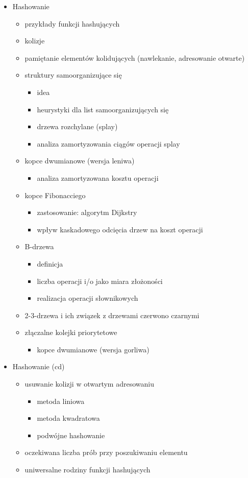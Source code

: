 \begin{itemize}
\item Hashowanie
\begin{itemize}
	\item przykłady funkcji hashujących
	\item kolizje
	\item pamiętanie elementów kolidujących (nawlekanie, adresowanie otwarte)
	\item struktury samoorganizujące się
	\begin{itemize}
		\item idea
		\item heurystyki dla list samoorganizujących się
		\item drzewa rozchylane (splay)
		\item analiza zamortyzowania ciągów operacji splay
	\end{itemize}
	\item kopce dwumianowe (wersja leniwa)
	\begin{itemize}
		\item analiza zamortyzowana kosztu operacji
	\end{itemize}
	\item kopce Fibonacciego
	\begin{itemize}
		\item zastosowanie: algorytm Dijkstry
		\item wpływ kaskadowego odcięcia drzew na koszt operacji
	\end{itemize}
	\item B-drzewa
	\begin{itemize}
		\item definicja
		\item liczba operacji i/o jako miara złożoności
		\item realizacja operacji słownikowych
	\end{itemize}
	\item 2-3-drzewa i ich związek z drzewami czerwono czarnymi
	\item złączalne kolejki priorytetowe
	\begin{itemize}
		\item kopce dwumianowe (wersja gorliwa)
	\end{itemize}
\end{itemize}

\item Hashowanie (cd)
\begin{itemize}
	\item usuwanie kolizji w otwartym adresowaniu
	\begin{itemize}
		\item metoda liniowa
		\item metoda kwadratowa
		\item podwójne hashowanie
	\end{itemize}
	\item oczekiwana liczba prób przy poszukiwaniu elementu
	\item uniwersalne rodziny funkcji hashujących
\end{itemize}


\end{itemize}
